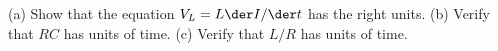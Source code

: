         (a) Show that the equation  $V_L=L\der I/\der t$ has the right units.\hwendpart
        (b) Verify that $RC$ has units of time.\hwendpart
        (c) Verify that $L/R$ has units of time.
